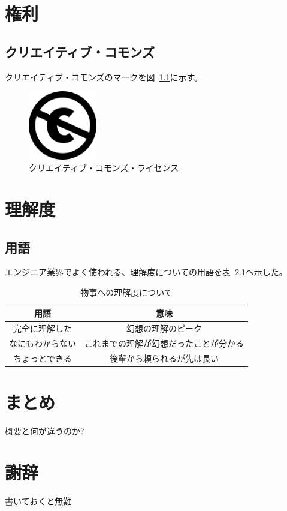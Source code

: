 \documentclass[a4j,openany,11px]{jsbook}
\begin{document}
\chapter{権利}
\section{クリエイティブ・コモンズ}
クリエイティブ・コモンズのマークを図~\ref{fig:cc}に示す。
\begin{figure}[htbp]
    \centering
    \includegraphics[width=30mm]{./figs/240px-Cc-public_domain_mark_white.png}
    \caption{クリエイティブ・コモンズ・ライセンス\label{fig:cc}}
\end{figure}


\chapter{理解度}
\section{用語}
エンジニア業界でよく使われる、理解度についての用語を表~\ref{tab:understanding}へ示した。
\begin{table}[htbp]
    \centering
    \caption{物事への理解度について\label{tab:understanding}}
    \begin{tabular}{c|c}
        用語             & 意味                                   \\
        \hline
        \hline
        完全に理解した   & 幻想の理解のピーク                     \\
        なにもわからない & これまでの理解が幻想だったことが分かる \\
        ちょっとできる   & 後輩から頼られるが先は長い             \\
        \hline
    \end{tabular}
\end{table}

\chapter{まとめ}
概要と何が違うのか?

\chapter*{謝辞}
書いておくと無難
\end{document}
